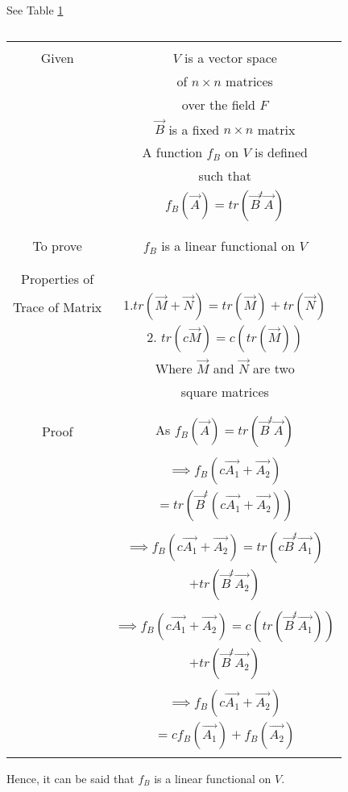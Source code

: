 
See Table \ref{table:solutions/3/7/8/a/}

\begin{table}[h!]
\begin{center}
\begin{tabular}{|c|c|}
\hline
& \\
Given & $V$ is a vector space\\
& of $n\times n$ matrices\\
& over the field $F$\\
& $\vec{B}$ is a fixed $n\times n$ matrix\\
& A function $f_B$ on $V$ is defined \\
& such that\\
& $f_B(\vec{A})= tr(\vec{B}^t \vec{A})$\\
& \\
\hline
& \\
To prove & $f_B$ is a linear functional on $V$\\
& \\
\hline
& \\
Properties of & \\
Trace of Matrix  & 1.$tr(\vec{M} + \vec{N})= tr(\vec{M}) +tr(\vec{N})$ \\
& 2. $tr(c\vec{M}) = c(tr(\vec{M}))$\\
& Where $\vec{M}$ and $\vec{N}$ are two \\
& square matrices\\
& \\
\hline
& \\
Proof & As $f_B(\vec{A})= tr(\vec{B}^t \vec{A})$\\
& \\
& $\implies f_B(c\vec{A_1} + \vec{A_2})$\\
& $= tr(\vec{B}^t (c\vec{A_1} + \vec{A_2}))$\\
& \\
& $\implies f_B(c\vec{A_1} + \vec{A_2})= tr(c \vec{B}^t \vec{A_1})$\\
& $+ tr(\vec{B}^t \vec{A_2})$\\
& \\
& $\implies f_B(c\vec{A_1} + \vec{A_2})= c (tr(\vec{B}^t \vec{A_1}))$\\
& $+ tr(\vec{B}^t \vec{A_2})$\\
& \\
& $\implies f_B(c\vec{A_1} + \vec{A_2})$\\
& $= c f_B(\vec{A_1}) + f_B(\vec{A_2})$\\
& \\
\hline
\end{tabular}
\end{center}
\caption{}
\label{table:solutions/3/7/8/a/}
\end{table}

Hence, it can be said that $f_B$ is a linear functional on $V$.

